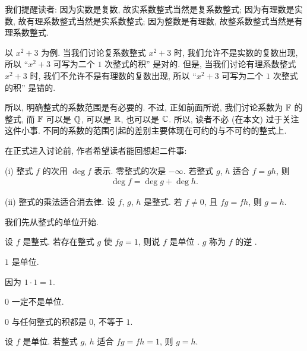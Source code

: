 \begin{remark}
    我们提醒读者: 因为实数是复数, 故实系数整式当然是复系数整式; 因为有理数是实数, 故有理系数整式当然是实系数整式; 因为整数是有理数, 故整系数整式当然是有理系数整式.

    以 $x^2 + 3$ 为例. 当我们讨论复系数整式 $x^2 + 3$ 时, 我们允许不是实数的复数出现, 所以 ``$x^2 + 3$ 可写为二个 $1$ 次整式的积'' 是对的. 但是, 当我们讨论有理系数整式 $x^2 + 3$ 时, 我们不允许不是有理数的复数出现, 所以 ``$x^2 + 3$ 可写为二个 $1$ 次整式的积'' 是错的.

    所以, 明确整式的系数范围是有必要的. 不过, 正如前面所说, 我们讨论系数为 $\mathbb{F}$ 的整式, 而 $\mathbb{F}$ 可以是 $\mathbb{Q}$, 可以是 $\mathbb{R}$, 也可以是 $\mathbb{C}$. 所以, 读者不必 (在本文) 过于关注这件小事. 不同的系数的范围引起的差别主要体现在可约的与不可约的整式上.
\end{remark}

在正式进入讨论前, 作者希望读者能回想起二件事:

(i) 整式 $f$ 的次用 $\deg f$ 表示. 零整式的次是 $-\infty$. 若整式 $g$, $h$ 适合 $f = gh$, 则
\begin{align*}
    \deg f = \deg g + \deg h.
\end{align*}

(ii) 整式的乘法适合消去律. 设 $f$, $g$, $h$ 是整式. 若 $f \neq 0$, 且 $fg = fh$, 则 $g = h$.

我们先从整式的单位开始.

\begin{definition}
    设 $f$ 是整式. 若存在整式 $g$ 使 $fg = 1$, 则说 $f$ 是单位 . $g$ 称为 $f$ 的逆 .
\end{definition}

\begin{proposition}
    $1$ 是单位.
\end{proposition}

\begin{pf}
    因为 $1 \cdot 1 = 1$.
\end{pf}

\begin{proposition}
    $0$ 一定不是单位.
\end{proposition}

\begin{pf}
    $0$ 与任何整式的积都是 $0$, 不等于 $1$.
\end{pf}

\begin{proposition}
    设 $f$ 是单位. 若整式 $g$, $h$ 适合 $fg = fh = 1$, 则 $g = h$.
\end{proposition}

